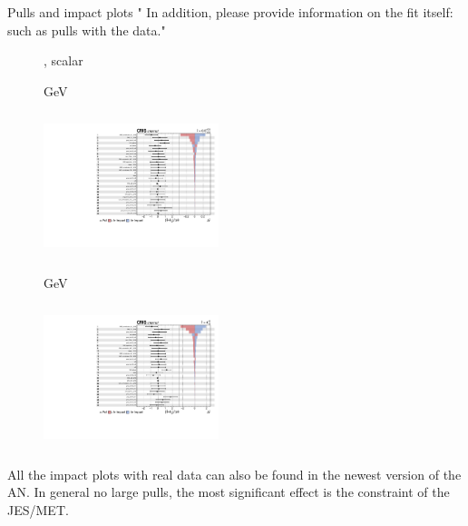 \documentclass[8pt]{beamer}
\begin{document}
\begin{frame}{Pulls and impact plots}
\justifying
" In addition,
please provide information on the fit itself: such as pulls with the
data." \vfill

\begin{figure}[htbp]
\centering
\begin{block}{, scalar}\end{block}	\vspace{-8pt}

\begin{minipage}[b]{0.49\textwidth}
\begin{center}
\centering \begin{block}{ GeV}\end{block}	
\includegraphics[width=5.1cm, height=4.2cm]{figs/impacts_2018_both_scalar_100.pdf}
\end{center}
\end{minipage}\hfill
\begin{minipage}[b]{0.49\textwidth}
\begin{center}
\centering \begin{block}{ GeV}\end{block}	
\includegraphics[width=5.1cm, height=4.2cm]{figs/impacts_2018_both_scalar_500.pdf}
\end{center}
\end{minipage} \hfill
\end{figure} \vfill

All the impact plots with real data can also be found in the newest version of the AN. In general no large pulls, the most significant effect is the constraint of the JES/MET. \vfill
\end{frame}
\end{document}
